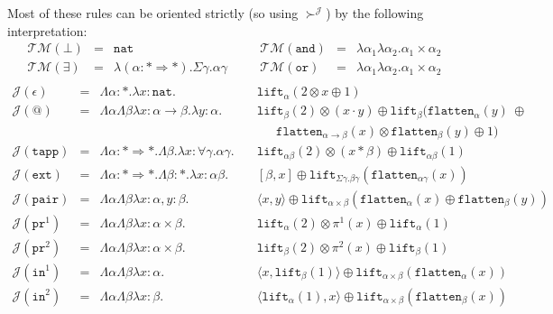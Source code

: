 \documentclass[a4paper,UKenglish,cleveref,autoref,numberwithinsect]{lipics-v2019}
\theoremstyle{definition}
\newcommand{\arrkind}{\Rightarrow}
\newcommand{\arrtype}{\rightarrow}
\newcommand{\quant}[2]{\forall #1.#2}
\newcommand{\pair}[2]{\langle #1,#2 \rangle}
\newcommand{\expair}[2]{[#1,#2]}
\newcommand{\nat}{\mathtt{nat}}
\newcommand{\flatten}{\mathtt{flatten}}
\newcommand{\lift}{\mathtt{lift}}
\newcommand{\Typemap}{\mathcal{T\!M}}
\newcommand{\Termmap}{\mathcal{J}}
\newcommand{\succinterpret}{\succ^{\Termmap}}
\newcommand{\proj}{\mathtt{pr}}
\begin{document}
Most of these rules can be oriented strictly (so using $\succinterpret$)
by the following interpretation:
\[
\begin{array}{rclcrcl}
\Typemap(\bot) & = & \nat
& \quad &
\Typemap(\mathtt{and}) & = & \lambda\alpha_1\lambda\alpha_2 . \alpha_1\times\alpha_2 \\

\Typemap(\exists) & = & \lambda(\alpha : * \arrkind *) . \Sigma \gamma . \alpha \gamma
& \quad &
\Typemap(\mathtt{or}) & = & \lambda\alpha_1\lambda\alpha_2 . \alpha_1\times\alpha_2 \\
\end{array}
\]
\[
\begin{array}{rcll}
\Termmap(\epsilon) & = & \Lambda \alpha:* . \lambda x:\nat. &
  \mathtt{lift}_\alpha(2 \otimes x \oplus 1) \\
\Termmap(@) & = & \Lambda\alpha\Lambda\beta\lambda x: \alpha \arrtype \beta . \lambda y :
  \alpha . \quad & \lift_\beta(2) \otimes (x \cdot y) \oplus
  \lift_\beta(\flatten_\alpha(y)\ \oplus \\
  & & & \phantom{AB}\flatten_{\alpha \arrtype \beta}(x) \otimes
  \flatten_\beta(y) \oplus 1) \\
\Termmap(\mathtt{tapp}) & = & \Lambda \alpha : * \arrkind * . \Lambda \beta . \lambda x : \quant{\gamma}{\alpha\gamma} . \quad &
  \lift_{\alpha\beta}(2) \otimes
  (x * \beta) \oplus \lift_{\alpha\beta}(1) \\
\Termmap(\mathtt{ext}) & = & \Lambda \alpha : * \arrkind * . \Lambda \beta : * . \lambda x:\alpha\beta . &
  \expair{\beta}{x} \oplus \lift_{\Sigma\gamma.\beta\gamma}(
  \flatten_{\alpha\gamma}(x)) \\
\Termmap(\mathtt{pair}) & = & \Lambda \alpha \Lambda \beta \lambda x :
  \alpha, y : \beta.\quad & \pair{x}{y} \oplus \lift_{
  \alpha \times \beta}(\flatten_\alpha(x) \oplus \flatten_{\beta}(y)) \\
\Termmap(\proj^1) & = & \Lambda \alpha \Lambda \beta \lambda x :
  \alpha \times \beta . \quad
  & \lift_\alpha(2) \otimes \pi^1(x) \oplus \lift_{\alpha}(1) \\
\Termmap(\proj^2) & = & \Lambda \alpha \Lambda \beta \lambda x :
  \alpha\times\beta.\quad
  & \lift_\beta(2) \otimes \pi^2(x) \oplus \lift_{\beta}(1) \\
\Termmap(\mathtt{in}^1) & = & \Lambda \alpha \Lambda \beta
  \lambda x : \alpha.\quad & \pair{x}{\lift_\beta(1)}
  \oplus \lift_{\alpha
  \times \beta}(\flatten_{\alpha}(x)) \\
\Termmap(\mathtt{in}^2) & = & \Lambda \alpha \Lambda \beta
  \lambda x : \beta.\quad & \pair{\lift_\alpha(1)}{x}
  \oplus \lift_{\alpha \times \beta}(\flatten_{\beta}(x)) \\
\end{array}
\]
\end{document}
